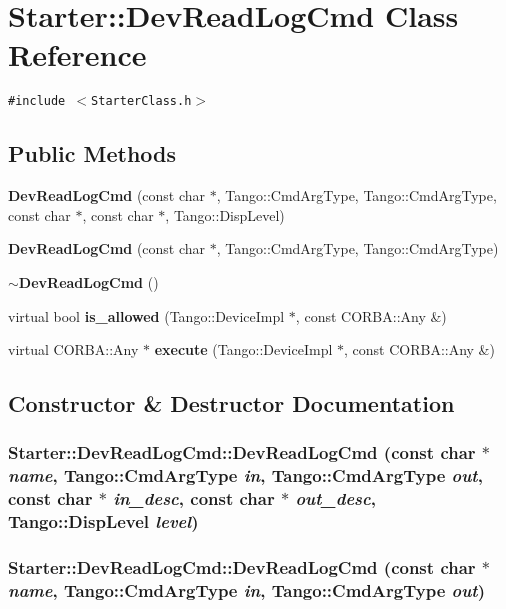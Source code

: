 \section{Starter::Dev\-Read\-Log\-Cmd  Class Reference}
\label{classStarter_1_1DevReadLogCmd}
{\tt \#include $<$Starter\-Class.h$>$}

\subsection*{Public Methods}
\begin{CompactItemize}
\item 
{\bf Dev\-Read\-Log\-Cmd} (const char $\ast$, Tango::Cmd\-Arg\-Type, Tango::Cmd\-Arg\-Type, const char $\ast$, const char $\ast$, Tango::Disp\-Level)
\item 
{\bf Dev\-Read\-Log\-Cmd} (const char $\ast$, Tango::Cmd\-Arg\-Type, Tango::Cmd\-Arg\-Type)
\item 
{\bf $\sim$Dev\-Read\-Log\-Cmd} ()
\item 
virtual bool {\bf is\_\-allowed} (Tango::Device\-Impl $\ast$, const CORBA::Any \&)
\item 
virtual CORBA::Any $\ast$ {\bf execute} (Tango::Device\-Impl $\ast$, const CORBA::Any \&)
\end{CompactItemize}


\subsection{Constructor \& Destructor Documentation}
\subsubsection{\setlength{\rightskip}{0pt plus 5cm}Starter::Dev\-Read\-Log\-Cmd::Dev\-Read\-Log\-Cmd (const char $\ast$ {\em name}, Tango::Cmd\-Arg\-Type {\em in}, Tango::Cmd\-Arg\-Type {\em out}, const char $\ast$ {\em in\_\-desc}, const char $\ast$ {\em out\_\-desc}, Tango::Disp\-Level {\em level})}\label{classStarter_1_1DevReadLogCmd_a0}


\subsubsection{\setlength{\rightskip}{0pt plus 5cm}Starter::Dev\-Read\-Log\-Cmd::Dev\-Read\-Log\-Cmd (const char $\ast$ {\em name}, Tango::Cmd\-Arg\-Type {\em in}, Tango::Cmd\-Arg\-Type {\em out})}\label{classStarter_1_1DevReadLogCmd_a1}


